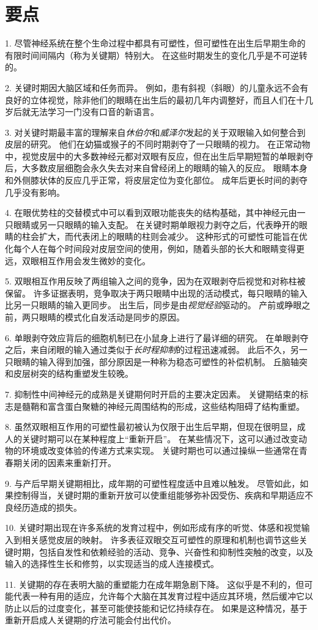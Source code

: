 \section{要点}

1. 尽管神经系统在整个生命过程中都具有可塑性，但可塑性在出生后早期生命的有限时间间隔内（称为关键期）特别大。
在这些时期发生的变化几乎是不可逆转的。


2. 关键时期因大脑区域和任务而异。
例如，患有斜视（斜眼）的儿童永远不会有良好的立体视觉，除非他们的眼睛在出生后的最初几年内调整好，而且人们在十几岁后就无法学习一门没有口音的新语言。


3. 对关键时期最丰富的理解来自\textit{休伯尔}和\textit{威泽尔}发起的关于双眼输入如何整合到皮层的研究。
他们在幼猫或猴子的不同时期剥夺了一只眼睛的视力。
在正常动物中，视觉皮层中的大多数神经元都对双眼有反应，但在出生后早期短暂的单眼剥夺后，大多数皮层细胞会永久失去对来自曾经闭上的眼睛的输入的反应。
眼睛本身和外侧膝状体的反应几乎正常，将皮层定位为变化部位。
成年后更长时间的剥夺几乎没有影响。

4. 在眼优势柱的交替模式中可以看到双眼功能丧失的结构基础，其中神经元由一只眼睛或另一只眼睛的输入支配。
在关键时期单眼视力剥夺之后，代表睁开的眼睛的柱会扩大，而代表闭上的眼睛的柱则会减少。
这种形式的可塑性可能旨在优化每个人在每个时间段对皮层空间的使用，例如，随着头部的长大和眼睛变得更远，双眼相互作用会发生微妙的变化。


5. 双眼相互作用反映了两组输入之间的竞争，因为在双眼剥夺后视觉和对称柱被保留。
许多证据表明，竞争取决于两只眼睛中出现的活动模式，每只眼睛的输入比另一只眼睛的输入更同步。
出生后，同步是由\textit{视觉经验}驱动的。
产前或睁眼之前，两只眼睛的模式化自发活动是同步的原因。


6. 单眼剥夺效应背后的细胞机制已在小鼠身上进行了最详细的研究。
在单眼剥夺之后，来自闭眼的输入通过类似于\textit{长时程抑制}的过程迅速减弱。
此后不久，另一只眼睛的输入得到加强，部分原因是一种称为稳态可塑性的补偿机制。
丘脑轴突和皮层树突的结构重塑发生较晚。


7. 抑制性中间神经元的成熟是关键期何时开启的主要决定因素。
关键期结束的标志是髓鞘和富含蛋白聚糖的神经元周围结构的形成，这些结构阻碍了结构重塑。


8. 虽然双眼相互作用的可塑性最初被认为仅限于出生后早期，但现在很明显，成人的关键时期可以在某种程度上“重新开启”。
在某些情况下，这可以通过改变动物的环境或改变体验的传递方式来实现。
关键时期也可以通过操纵一些通常在青春期关闭的因素来重新打开。


9. 与产后早期关键期相比，成年期的可塑性程度适中且难以触发。
尽管如此，如果控制得当，关键时期的重新开放可以使重组能够弥补因受伤、疾病和早期适应不良经历造成的损失。


10. 关键时期出现在许多系统的发育过程中，例如形成有序的听觉、体感和视觉输入到相关感觉皮层的映射。
许多表征双眼交互可塑性的原理和机制也调节这些关键时期，包括自发性和依赖经验的活动、竞争、兴奋性和抑制性突触的改变，以及输入的选择性生长和修剪，以实现适当的成人连接模式。


11. 关键期的存在表明大脑的重塑能力在成年期急剧下降。
这似乎是不利的，但可能代表一种有用的适应，允许每个大脑在其发育过程中适应其环境，然后缓冲它以防止以后的过度变化，甚至可能使技能和记忆持续存在。
如果是这种情况，基于重新开启成人关键期的疗法可能会付出代价。



